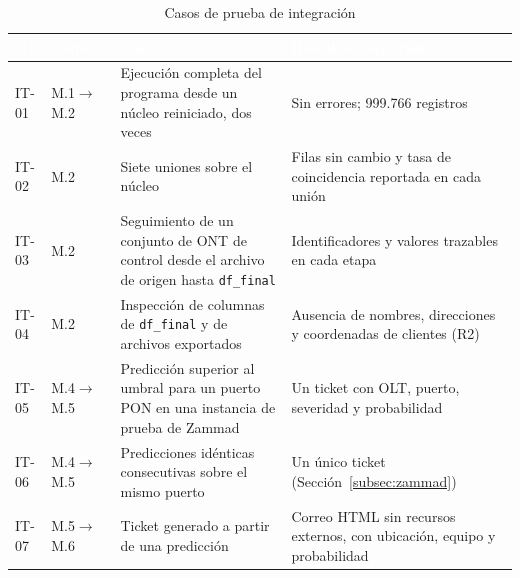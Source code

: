 \documentclass[12pt,a4paper]{article}
\begin{document}
\begin{table}[H]
\centering
\caption{Casos de prueba de integración}
\label{tab:integracion}
\small
\renewcommand{\arraystretch}{1.3}
\begin{tabularx}{\textwidth}{|p{1.15cm}|p{1.9cm}|X|X|}
\hline
\rowcolor{black}
\textcolor{white}{\textbf{ID}} & \textcolor{white}{\textbf{Cadena}} & \textcolor{white}{\textbf{Caso}} & \textcolor{white}{\textbf{Resultado esperado}} \\ \hline
IT-01 & M.1$\rightarrow$M.2 & Ejecución completa del programa desde un núcleo reiniciado, dos veces & Sin errores; 999.766 registros \\ \hline
IT-02 & M.2 & Siete uniones sobre el núcleo & Filas sin cambio y tasa de coincidencia reportada en cada unión \\ \hline
IT-03 & M.2 & Seguimiento de un conjunto de ONT de control desde el archivo de origen hasta \texttt{df\_final} & Identificadores y valores trazables en cada etapa \\ \hline
IT-04 & M.2 & Inspección de columnas de \texttt{df\_final} y de archivos exportados & Ausencia de nombres, direcciones y coordenadas de clientes (R2) \\ \hline
IT-05 & M.4$\rightarrow$M.5 & Predicción superior al umbral para un puerto PON en una instancia de prueba de Zammad & Un ticket con OLT, puerto, severidad y probabilidad \\ \hline
IT-06 & M.4$\rightarrow$M.5 & Predicciones idénticas consecutivas sobre el mismo puerto & Un único ticket (Sección~\ref{subsec:zammad}) \\ \hline
IT-07 & M.5$\rightarrow$M.6 & Ticket generado a partir de una predicción & Correo HTML sin recursos externos, con ubicación, equipo y probabilidad \\ \hline
\end{tabularx}
\end{table}
\end{document}
